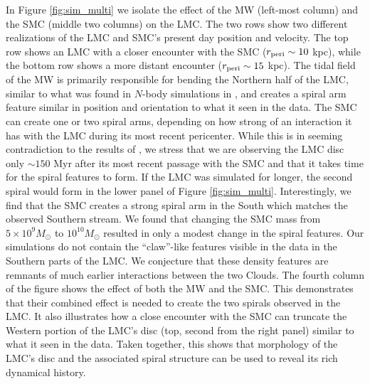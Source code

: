 \documentclass[a4paper,useAMS,usenatbib]{mnras}
\begin{document}
In Figure \ref{fig:sim_multi} we isolate the effect of the MW
(left-most column) and the SMC (middle two columns) on the LMC. The
two rows show two different realizations of the LMC and SMC's present
day position and velocity. The top row shows an LMC with a closer
encounter with the SMC ($r_{\rm peri} \sim 10$ kpc), while the bottom
row shows a more distant encounter ($r_{\rm peri} \sim 15$ kpc). The
tidal field of the MW is primarily responsible for bending the
Northern half of the LMC, similar to what was found in $N$-body
simulations in \cite{Mackey2016}, and creates a spiral arm feature
similar in position and orientation to what it seen in the data. The
SMC can create one or two spiral arms, depending on how strong of an
interaction it has with the LMC during its most recent
pericenter. While this is in seeming contradiction to the results of
\cite{Toomre1972}, we stress that we are observing the LMC disc only
$\sim 150$ Myr after its most recent passage with the SMC and that it
takes time for the spiral features to form. If the LMC was simulated
for longer, the second spiral would form in the lower panel of Figure
\ref{fig:sim_multi}. Interestingly, we find that the SMC creates a
strong spiral arm in the South which matches the observed Southern
stream. We found that changing the SMC mass from $5\times 10^9
M_\odot$ to $10^{10} M_\odot$ resulted in only a modest change in the
spiral features. Our simulations do not contain the ``claw''-like
features visible in the data in the Southern parts of the LMC. We
conjecture that these density features are remnants of much earlier
interactions between the two Clouds. The fourth column of the figure
shows the effect of both the MW and the SMC. This
demonstrates that their combined effect is needed to create the two
spirals observed in the LMC. It also illustrates how a close encounter
with the SMC can truncate the Western portion of the LMC's disc (top,
second from the right panel) similar to what it seen in the
data. Taken together, this shows that morphology of the LMC's disc and
the associated spiral structure can be used to reveal its rich
dynamical history.
\end{document}
